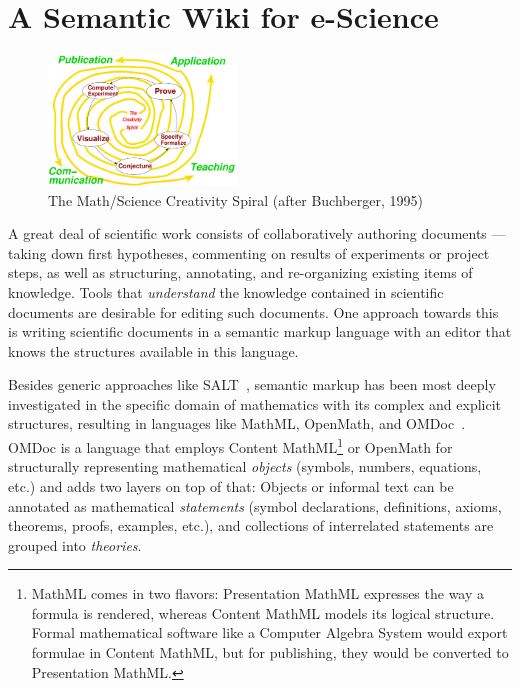 \section{A Semantic Wiki for e-Science}

\begin{figure}
  \centering
  \vspace{-.5cm}
  \includegraphics[width=5cm]{creativity-spiral}
  \vspace{-.5cm}
  \caption{The Math/Science Creativity Spiral (after Buchberger, 1995)}
  \label{fig:creativity-spiral}
\end{figure}


A great deal of scientific work consists of collaboratively authoring documents --- taking
down first hypotheses, commenting on results of experiments or project steps, as well as
structuring, annotating, and re-organizing existing items of knowledge.  Tools
that \emph{understand} the knowledge contained in scientific documents are desirable for
editing such documents.  One approach towards this is writing scientific documents in a semantic
markup language with an editor that knows the structures available in this language.

Besides generic approaches like SALT~\cite{Groza:SALT07}, semantic markup has been most
deeply investigated in the specific domain of mathematics with its complex and explicit
structures, resulting in languages like MathML, OpenMath,  and
OMDoc~\cite{Kohlhase:omdoc1.2}.  OMDoc is a language that employs Content
MathML\footnote{MathML comes in two flavors: Presentation MathML expresses the way a
  formula is rendered, whereas Content MathML models its logical structure.  Formal
  mathematical software like a Computer Algebra System would export formulae in Content
  MathML, but for publishing, they would be converted to Presentation MathML.} or OpenMath
for structurally representing mathematical \emph{objects} (symbols, numbers, equations,
etc.) and adds two layers on top of that: Objects or informal text can be annotated as
mathematical \emph{statements} (symbol declarations, definitions, axioms, theorems,
proofs, examples, etc.), and collections of interrelated statements are grouped into
\emph{theories}.

